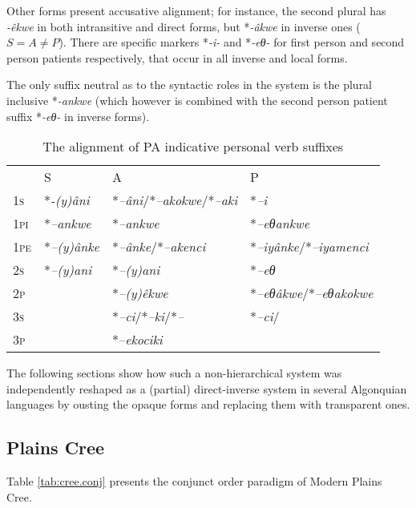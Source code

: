 \documentclass[twoside,a4paper,11pt]{article}
\newcommand{\ipa}[1]{{\phon\textit{#1}}}
\newcommand{\Σ}{\greek{Σ}}
\begin{document}
Other forms present accusative alignment; for instance, the second plural has \ipa{-êkwe} in both intransitive and direct forms, but *\ipa{-âkwe}  in inverse ones ($S = A \ne P$). There are specific markers *\ipa{-i-} and *\ipa{-eθ-} for first person and second person patients respectively, that occur in all inverse and local forms.

The only suffix neutral as to the syntactic roles in the system is the plural inclusive *\ipa{-ankwe} (which however is combined with 
the second person patient suffix *\ipa{-eθ-} in inverse forms).


\begin{table}[H]
\caption{The alignment of PA indicative personal verb suffixes}
\centering \label{tab:protoalg.align}
\begin{tabular}{llll}
\toprule
& S & A & P\\
\textsc{1s} & *\ipa{-(y)âni} & *\ipa{--âni}/*\ipa{--akokwe}/*\ipa{--aki} & *\ipa{--i}\\
\textsc{1pi} & *\ipa{--ankwe} & *\ipa{--ankwe} & *\ipa{--eθankwe}\\
\textsc{1pe} & *\ipa{--(y)ânke} & *\ipa{--ânke}/*\ipa{--akenci} & *\ipa{--iyânke}/*\ipa{--iyamenci}\\
\midrule
\textsc{2s} & *\ipa{--(y)ani} & *\ipa{--(y)ani} & *\ipa{--eθ}\\
\textsc{2p} & 	& *\ipa{--(y)êkwe} & *\ipa{--eθâkwe}/*\ipa{--eθakokwe}\\
\midrule
\textsc{3s} & 	 & 	*\ipa{--ci}/*\ipa{--ki}/*\ipa{--} & *\ipa{--ci}/\\
\textsc{3p} & 	 & 	*\ipa{--ekociki} & \\
\bottomrule
\end{tabular}
\end{table}


The following sections show how such a non-hierarchical system was independently reshaped as a (partial) direct-inverse system in several Algonquian languages by ousting the opaque forms and replacing them with transparent ones. 
 

\subsection{Plains Cree}
Table \vref{tab:cree.conj} presents the conjunct order paradigm of Modern Plains Cree.
\end{document}
